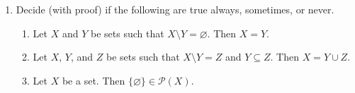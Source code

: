 \documentclass[12pt]{amsart}
\theoremstyle{definition}
\begin{document}
\begin{enumerate}
	\item Decide (with proof) if the following are true always, sometimes, or never. 
		\begin{enumerate}
			\item Let $X$ and $Y$ be sets such that $X \setminus Y 
				= \varnothing$. Then $X = Y$.
			\item Let $X$, $Y$, and $Z$ be sets such that $X \setminus Y = Z$ 
				and $Y \subseteq Z$. Then $X = Y \cup Z$.
			\item Let $X$ be a set. Then $\{\varnothing\} \in \mathcal P(X)$. 
		\end{enumerate}
		
\end{enumerate}
\end{document}
